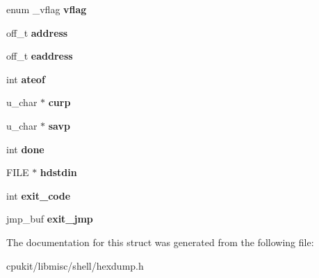 \begin{DoxyCompactItemize}
enum \+\_\+vflag {\bfseries vflag}
\item 
\mbox{\label{structrtems__shell__hexdump__globals__t_aaef0db7b4768602a8145f8e3d7d51ee3}} 
off\+\_\+t {\bfseries address}
\item 
\mbox{\label{structrtems__shell__hexdump__globals__t_a21de7755f10d72951cfcfa7a0e6b3caf}} 
off\+\_\+t {\bfseries eaddress}
\item 
\mbox{\label{structrtems__shell__hexdump__globals__t_a2fc8c46dc50ea49d0cdd6d97e0f3f99f}} 
int {\bfseries ateof}
\item 
\mbox{\label{structrtems__shell__hexdump__globals__t_a27cdfb820755ee497ca1f120d4aa1684}} 
u\+\_\+char $\ast$ {\bfseries curp}
\item 
\mbox{\label{structrtems__shell__hexdump__globals__t_a04839a9ffc0eeb67b0ccb7232999c1ce}} 
u\+\_\+char $\ast$ {\bfseries savp}
\item 
\mbox{\label{structrtems__shell__hexdump__globals__t_a90def4afabbf4dc68e1cfe00024bf49f}} 
int {\bfseries done}
\item 
\mbox{\label{structrtems__shell__hexdump__globals__t_a23f8b8cb1e44a6ac58d64f820b7a225b}} 
F\+I\+LE $\ast$ {\bfseries hdstdin}
\item 
\mbox{\label{structrtems__shell__hexdump__globals__t_a2a7c59003116c31e20f5fe3b635cb3f9}} 
int {\bfseries exit\+\_\+code}
\item 
\mbox{\label{structrtems__shell__hexdump__globals__t_abccc12de004a80436d4e2992c7645e17}} 
jmp\+\_\+buf {\bfseries exit\+\_\+jmp}
\end{DoxyCompactItemize}


The documentation for this struct was generated from the following file\+:\begin{DoxyCompactItemize}
\item 
cpukit/libmisc/shell/hexdump.\+h\end{DoxyCompactItemize}

